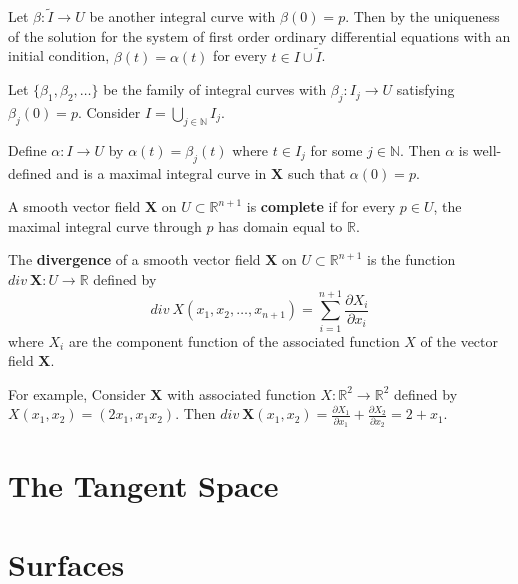 	Let $\beta : \tilde{I} \to U$ be another integral curve with $\beta(0) = p$.
	Then by the uniqueness of the solution for the system of first order ordinary differential equations with an initial condition, $\beta(t) = \alpha(t)$ for every $ t \in I \cup \tilde{I}$.

	Let $\{\beta_1,\beta_2,\dots\}$ be the family of integral curves with $\beta_j : I_j \to U$ satisfying $\beta_j(0) = p$.
	Consider $I = \bigcup\limits_{j \in \mathbb{N}} I_j$.

	Define $\alpha : I \to U$ by $\alpha(t) = \beta_j(t)$ where $t \in I_j$ for some $j \in \mathbb{N}$.
	Then $\alpha$ is well-defined and is a maximal integral curve in $\mathbf{X}$ such that $\alpha(0) = p$.

\begin{definition}
	A smooth vector field $\mathbf{X}$ on $U \subset \mathbb{R}^{n+1}$ is \textbf{complete} if for every $p \in U$, the maximal integral curve through $p$ has domain equal to $\mathbb{R}$.
\end{definition}

\begin{definition}
	The \textbf{divergence} of a smooth vector field $\mathbf{X}$ on $U \subset \mathbb{R}^{n+1}$ is the function $div\ \mathbf{X} : U \to \mathbb{R}$ defined by
	\[ div\ X(x_1,x_2,\dots,x_{n+1}) = \sum_{i=1}^{n+1} \frac{\partial X_i}{\partial x_i} \]
	where $X_i$ are the component function of the associated function $X$ of the vector field $\mathbf{X}$.
\end{definition}

For example, Consider $\mathbf{X}$ with associated function $X : \mathbb{R}^2 \to \mathbb{R}^2$ defined by $X(x_1,x_2) = (2x_1,x_1x_2)$.
Then $div\ \mathbf{X}(x_1,x_2) = \frac{\partial X_1}{\partial x_1} + \frac{\partial X_2}{\partial x_2} = 2 + x_1$.

\section{The Tangent Space}

\section{Surfaces}

